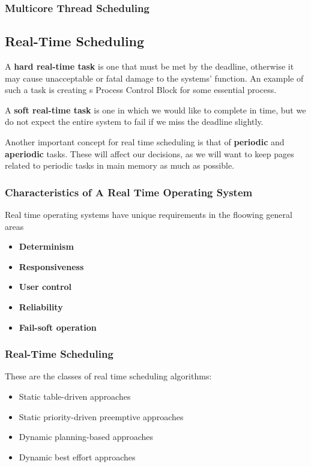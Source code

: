 \documentclass[11pt]{article}
\begin{document}
\subsubsection{Multicore Thread Scheduling}
\label{sec:orgheadline112}

\subsection{Real-Time Scheduling}
\label{sec:orgheadline119}

A \textbf{hard real-time task} is one that must be met by the deadline,
otherwise it may cause unacceptable or fatal damage to the systems'
function. An example of such a task is creating s Process Control
Block for some essential process.

A \textbf{soft real-time task} is one in which we would like to complete
in time, but we do not expect the entire system to fail if we miss
the deadline slightly.

Another important concept for real time scheduling is that of 
\textbf{periodic} and \textbf{aperiodic} tasks. These will affect our decisions, 
as we will want to keep pages related to periodic tasks in main memory as much as
possible.

\subsubsection{Characteristics of A Real Time Operating System}
\label{sec:orgheadline114}

Real time operating systems have unique requirements 
in the floowing general areas

\begin{itemize}
\item \textbf{Determinism}
\item \textbf{Responsiveness}
\item \textbf{User control}
\item \textbf{Reliability}
\item \textbf{Fail-soft operation}
\end{itemize}

\subsubsection{Real-Time Scheduling}
\label{sec:orgheadline115}

These are the classes of real time scheduling algorithms:

\begin{itemize}
\item Static table-driven approaches
\item Static priority-driven preemptive approaches
\item Dynamic planning-based approaches
\item Dynamic best effort approaches
\end{itemize}
\end{document}
